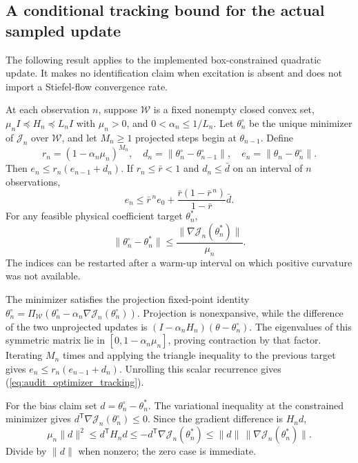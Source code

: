 \documentclass[journal]{IEEEtran}
\begin{document}
\subsection{A conditional tracking bound for the actual sampled update}
The following result applies to the implemented box-constrained quadratic
update. It makes no identification claim when excitation is absent and
does not import a Stiefel-flow convergence rate.

\begin{auditproposition}
\label{prop:audit_tracking}
At each observation $n$, suppose $\mathcal W$ is a fixed nonempty closed
convex set, $\mu_n I\preceq H_n\preceq L_nI$ with $\mu_n>0$, and
$0<\alpha_n\le1/L_n$. Let $\theta_n^\circ$ be the unique minimizer
of $\mathcal J_n$ over $\mathcal W$, and let $M_n\ge1$ projected steps begin
at $\theta_{n-1}$. Define
\begin{equation}
 r_n=(1-\alpha_n\mu_n)^{M_n},\quad
 d_n=\|\theta_n^\circ-\theta_{n-1}^\circ\|,\quad
 e_n=\|\theta_n-\theta_n^\circ\|.
\end{equation}
Then $e_n\le r_n(e_{n-1}+d_n)$. If $r_n\le\bar r<1$ and
$d_n\le\bar d$ on an interval of $n$ observations,
\begin{equation}
 e_n\le\bar r^{\,n}e_0+
       \frac{\bar r(1-\bar r^{\,n})}{1-\bar r}\bar d.
 \label{eq:audit_optimizer_tracking}
\end{equation}
For any feasible physical coefficient target $\theta_n^*$,
\begin{equation}
 \|\theta_n^\circ-\theta_n^*\|
 \le\frac{\|\nabla\mathcal J_n(\theta_n^*)\|}{\mu_n}.
 \label{eq:audit_physical_bias}
\end{equation}
The indices can be restarted after a warm-up interval on which positive
curvature was not available.
\end{auditproposition}
\begin{IEEEproof}
The minimizer satisfies the projection fixed-point identity
$\theta_n^\circ=\Pi_{\mathcal W}(\theta_n^\circ-
\alpha_n\nabla\mathcal J_n(\theta_n^\circ))$.
Projection is nonexpansive, while the difference of the two unprojected
updates is $(I-\alpha_nH_n)(\theta-\theta_n^\circ)$.
The eigenvalues of this symmetric matrix lie in
$[0,1-\alpha_n\mu_n]$, proving contraction by that factor. Iterating
$M_n$ times and applying the triangle inequality to the previous target
gives $e_n\le r_n(e_{n-1}+d_n)$. Unrolling this scalar recurrence
gives (\ref{eq:audit_optimizer_tracking}).

For the bias claim set $d=\theta_n^\circ-\theta_n^*$.
The variational inequality at the constrained minimizer gives
$d^{\mathsf T}\nabla\mathcal J_n(\theta_n^\circ)\le0$.
Since the gradient difference is $H_nd$,
\begin{equation*}
 \mu_n\|d\|^2\le d^{\mathsf T}H_nd
 \le-d^{\mathsf T}\nabla\mathcal J_n(\theta_n^*)
 \le\|d\|\,\|\nabla\mathcal J_n(\theta_n^*)\|.
\end{equation*}
Divide by $\|d\|$ when nonzero; the zero case is immediate.
\end{IEEEproof}
\end{document}
